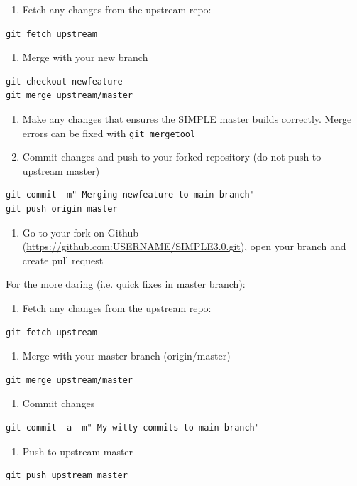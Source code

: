 \documentclass[a4paper,11pt]{article}
\begin{document}
\begin{enumerate}
\item Fetch any changes from the upstream repo:
\end{enumerate}
\begin{verbatim}
git fetch upstream
\end{verbatim}
\begin{enumerate}
\item Merge with your new branch
\end{enumerate}
\begin{verbatim}
git checkout newfeature
git merge upstream/master
\end{verbatim}

\begin{enumerate}
\item Make any changes that ensures the SIMPLE master builds correctly. Merge errors can be fixed with \texttt{git mergetool}

\item Commit changes and push to your forked repository (do not push to upstream master)
\end{enumerate}
\begin{verbatim}
git commit -m" Merging newfeature to main branch"
git push origin master
\end{verbatim}

\begin{enumerate}
\item Go to your fork on Github (\url{https://github.com:USERNAME/SIMPLE3.0.git}), open your branch and create pull request
\end{enumerate}


For the more daring (i.e. quick fixes in master branch):
\begin{enumerate}
\item Fetch any changes from the upstream repo:
\end{enumerate}
\begin{verbatim}
git fetch upstream
\end{verbatim}
\begin{enumerate}
\item Merge with your master branch (origin/master)
\end{enumerate}
\begin{verbatim}
git merge upstream/master
\end{verbatim}
\begin{enumerate}
\item Commit changes
\end{enumerate}
\begin{verbatim}
git commit -a -m" My witty commits to main branch"
\end{verbatim}
\begin{enumerate}
\item Push to upstream master
\end{enumerate}
\begin{verbatim}
git push upstream master
\end{verbatim}
\end{document}
